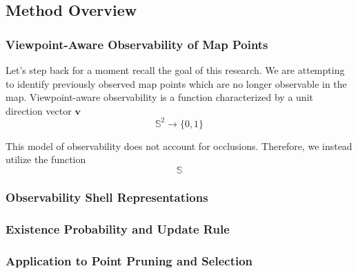 \subsection{Method Overview}

\subsubsection{Viewpoint-Aware Observability of Map Points}


Let's step back for a moment recall the goal of this research. We are attempting to identify previously observed map points which are no longer observable in the map. Viewpoint-aware observability is a function characterized by a unit direction vector $\mathbf{v}$
$$
    \mathbb{S}^2\rightarrow\{0,1\}
$$


This model of observability does not account for occlusions. Therefore, we instead utilize the function
$$
    \mathbb{S}
$$



\subsubsection{Observability Shell Representations}

\subsubsection{Existence Probability and Update Rule}

\subsubsection{Application to Point Pruning and Selection}
